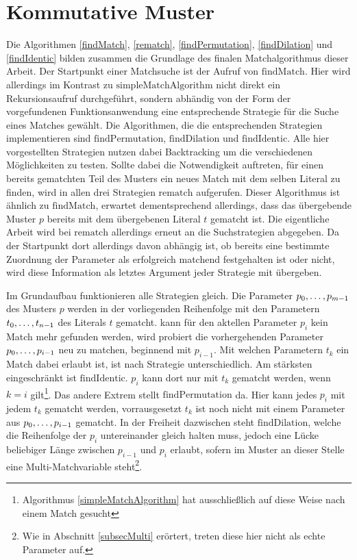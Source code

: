 \section{Kommutative Muster} \label{subsecACMuster}

Die Algorithmen \ref{findMatch}, \ref{rematch}, \ref{findPermutation}, \ref{findDilation} und \ref{findIdentic} bilden zusammen die Grundlage des finalen Matchalgorithmus dieser Arbeit. Der Startpunkt einer Matchsuche ist der Aufruf von $\mathrm{findMatch}$. Hier wird allerdings im Kontrast zu $\mathrm{simpleMatchAlgorithm}$ nicht direkt ein Rekursionsaufruf durchgeführt, sondern abhändig von der Form der vorgefundenen Funktionsanwendung eine entsprechende Strategie für die Suche eines Matches gewählt. Die Algorithmen, die die entsprechenden Strategien implementieren sind $\mathrm{findPermutation}$, $\mathrm{findDilation}$ und $\mathrm{findIdentic}$. Alle hier vorgestellten Strategien nutzen dabei Backtracking um die verschiedenen Möglichkeiten zu testen. Sollte dabei die Notwendigkeit auftreten, für einen bereits gematchten Teil des Musters ein neues Match mit dem selben Literal zu finden, wird in allen drei Strategien $\mathrm{rematch}$ aufgerufen. Dieser Algorithmus ist ähnlich zu $\mathrm{findMatch}$, erwartet dementsprechend allerdings, dass das übergebende Muster $p$ bereits mit dem übergebenen Literal $t$ gematcht ist. Die eigentliche Arbeit wird bei $\mathrm{rematch}$ allerdings erneut an die Suchstrategien abgegeben. Da der Startpunkt dort allerdings davon abhängig ist, ob bereits eine bestimmte Zuordnung der Parameter als erfolgreich matchend festgehalten ist oder nicht, wird diese Information als letztes Argument jeder Strategie mit übergeben.


Im Grundaufbau funktionieren alle Strategien gleich. Die Parameter ${p}_{0}, \dots, {p}_{m-1}$ des Musters $p$ werden in der vorliegenden Reihenfolge mit den Parametern ${t}_{0}, \dots, {t}_{n-1}$ des Literals $t$ gematcht. kann für den aktellen Parameter $p_i$ kein Match mehr gefunden werden, wird probiert die vorhergehenden Parameter ${p}_{0}, \dots, {p}_{i-1}$ neu zu matchen, beginnend mit $p_{i-1}$. Mit welchen Parametern $t_k$ ein Match dabei erlaubt ist, ist nach Strategie unterschiedlich. Am stärksten eingeschränkt ist $\mathrm{findIdentic}$. $p_i$ kann dort nur mit $t_k$ gematcht werden, wenn $k = i$ gilt\footnote{Algorithmus \ref{simpleMatchAlgorithm} hat ausschließlich auf diese Weise nach einem Match gesucht}. Das andere Extrem stellt $\mathrm{findPermutation}$ da. Hier kann jedes $p_i$ mit jedem $t_k$ gematcht werden, vorrausgesetzt $t_k$ ist noch nicht mit einem Parameter aus ${p}_{0}, \dots, {p}_{i-1}$ gematcht. In der Freiheit dazwischen steht $\mathrm{findDilation}$, welche die Reihenfolge der $p_i$ untereinander gleich halten muss, jedoch eine Lücke beliebiger Länge zwischen $p_{i-1}$ und $p_i$ erlaubt, sofern im Muster an dieser Stelle eine Multi-Matchvariable steht\footnote{Wie in Abschnitt \ref{subsecMulti} erörtert, treten diese hier nicht als echte Parameter auf.}.


